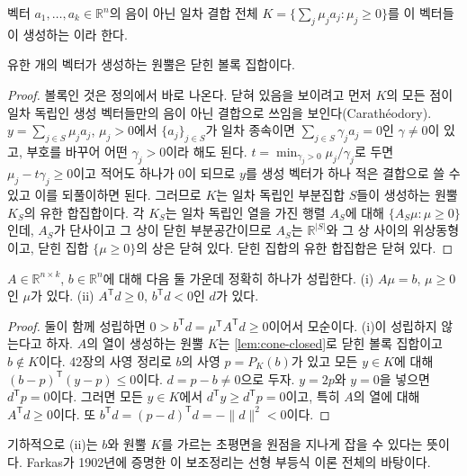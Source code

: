 벡터 $a_1,\dots,a_k\in\mathbb R^n$의 음이 아닌 일차 결합 전체 $K=\{\sum_j\mu_ja_j:\mu_j\ge0\}$를 이 벡터들이 생성하는 이라 한다.

\begin{lemma}
\label{lem:cone-closed}
유한 개의 벡터가 생성하는 원뿔은 닫힌 볼록 집합이다.
\end{lemma}

\begin{proof}
볼록인 것은 정의에서 바로 나온다. 닫혀 있음을 보이려고 먼저 $K$의 모든 점이 일차 독립인 생성 벡터들만의 음이 아닌 결합으로 쓰임을 보인다(Carathéodory). $y=\sum_{j\in S}\mu_ja_j$, $\mu_j>0$에서 $\{a_j\}_{j\in S}$가 일차 종속이면 $\sum_{j\in S}\gamma_ja_j=0$인 $\gamma\ne0$이 있고, 부호를 바꾸어 어떤 $\gamma_j>0$이라 해도 된다. $t=\min_{\gamma_j>0}\mu_j/\gamma_j$로 두면 $\mu_j-t\gamma_j\ge0$이고 적어도 하나가 $0$이 되므로 $y$를 생성 벡터가 하나 적은 결합으로 쓸 수 있고 이를 되풀이하면 된다. 그러므로 $K$는 일차 독립인 부분집합 $S$들이 생성하는 원뿔 $K_S$의 유한 합집합이다. 각 $K_S$는 일차 독립인 열을 가진 행렬 $A_S$에 대해 $\{A_S\mu:\mu\ge0\}$인데, $A_S$가 단사이고 그 상이 닫힌 부분공간이므로 $A_S$는 $\mathbb R^{|S|}$와 그 상 사이의 위상동형이고, 닫힌 집합 $\{\mu\ge0\}$의 상은 닫혀 있다. 닫힌 집합의 유한 합집합은 닫혀 있다.
\end{proof}

\begin{theorem}[Farkas]
\label{thm:farkas}
$A\in\mathbb R^{n\times k}$, $b\in\mathbb R^n$에 대해 다음 둘 가운데 정확히 하나가 성립한다.
(i) $A\mu=b$, $\mu\ge0$인 $\mu$가 있다.
(ii) $A^{\mathsf T}d\ge0$, $b^{\mathsf T}d<0$인 $d$가 있다.
\end{theorem}

\begin{proof}
둘이 함께 성립하면 $0>b^{\mathsf T}d=\mu^{\mathsf T}A^{\mathsf T}d\ge0$이어서 모순이다. (i)이 성립하지 않는다고 하자. $A$의 열이 생성하는 원뿔 $K$는 \cref{lem:cone-closed}로 닫힌 볼록 집합이고 $b\notin K$이다. 42장의 사영 정리로 $b$의 사영 $p=P_K(b)$가 있고 모든 $y\in K$에 대해 $(b-p)^{\mathsf T}(y-p)\le0$이다. $d=p-b\ne0$으로 두자. $y=2p$와 $y=0$을 넣으면 $d^{\mathsf T}p=0$이다. 그러면 모든 $y\in K$에서 $d^{\mathsf T}y\ge d^{\mathsf T}p=0$이고, 특히 $A$의 열에 대해 $A^{\mathsf T}d\ge0$이다. 또 $b^{\mathsf T}d=(p-d)^{\mathsf T}d=-\|d\|^2<0$이다.
\end{proof}

기하적으로 (ii)는 $b$와 원뿔 $K$를 가르는 초평면을 원점을 지나게 잡을 수 있다는 뜻이다. Farkas가 1902년에 증명한 이 보조정리\cite{farkas1902}는 선형 부등식 이론 전체의 바탕이다.

